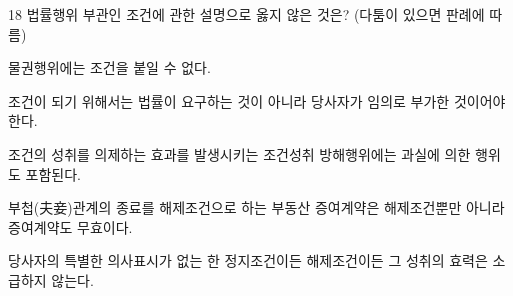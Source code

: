\begin{question}{18}
법률행위 부관인 조건에 관한 설명으로 옳지 않은 것은? (다툼이 있으면 판례에 따름)
\begin{choices}
  \item 물권행위에는 조건을 붙일 수 없다.
  \item 조건이 되기 위해서는 법률이 요구하는 것이 아니라 당사자가 임의로 부가한 것이어야 한다.
  \item 조건의 성취를 의제하는 효과를 발생시키는 조건성취 방해행위에는 과실에 의한 행위도 포함된다.
  \item 부첩(夫妾)관계의 종료를 해제조건으로 하는 부동산 증여계약은 해제조건뿐만 아니라 증여계약도 무효이다.
  \item 당사자의 특별한 의사표시가 없는 한 정지조건이든 해제조건이든 그 성취의 효력은 소급하지 않는다.
\end{choices}
\end{question}
